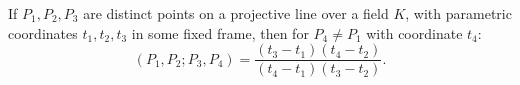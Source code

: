 If $P_1, P_2, P_3$ are distinct points on a projective line over a field $K$, with parametric coordinates $t_1, t_2, t_3$ in some fixed frame, then for $P_4 \neq P_1$ with coordinate $t_4$:
$$(P_1, P_2; P_3, P_4) = \frac{(t_3 - t_1)(t_4 - t_2)}{(t_4 - t_1)(t_3 - t_2)}.$$
